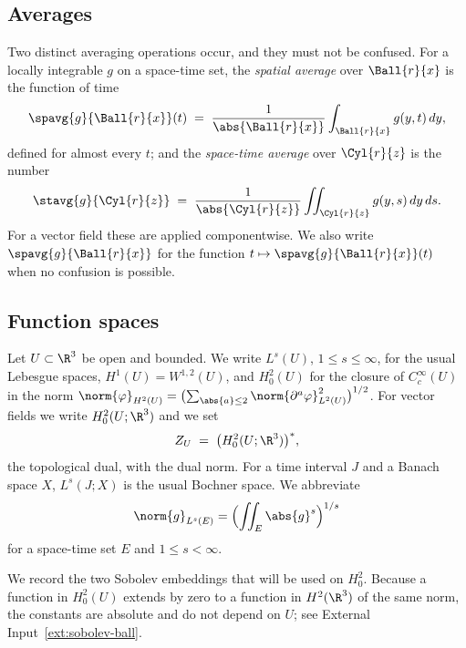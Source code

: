 \documentclass[11pt,reqno]{amsart}
\begin{document}
\subsection{Averages}\label{ss:averages}

Two distinct averaging operations occur, and they must not be confused. For a
locally integrable $g$ on a space-time set, the \emph{spatial average} over
$\Ball{r}{x}$ is the function of time
\begin{equation}\label{eq:spatial-average}
  \spavg{g}{\Ball{r}{x}}(t)
  \;=\;\frac{1}{\abs{\Ball{r}{x}}}\int_{\Ball{r}{x}}g(y,t)\,dy,
\end{equation}
defined for almost every $t$; and the \emph{space-time average} over
$\Cyl{r}{z}$ is the number
\begin{equation}\label{eq:spacetime-average}
  \stavg{g}{\Cyl{r}{z}}
  \;=\;\frac{1}{\abs{\Cyl{r}{z}}}\iint_{\Cyl{r}{z}}g(y,s)\,dy\,ds .
\end{equation}
For a vector field these are applied componentwise. We also write
$\spavg{g}{\Ball{r}{x}}$ for the function $t\mapsto\spavg{g}{\Ball{r}{x}}(t)$
when no confusion is possible.

\subsection{Function spaces}\label{ss:spaces}

Let $U\subset\R^{3}$ be open and bounded. We write $L^{s}(U)$, $1\le s\le\infty$,
for the usual Lebesgue spaces, $H^{1}(U)=W^{1,2}(U)$, and $H^{2}_{0}(U)$ for the
closure of $C_{c}^{\infty}(U)$ in the norm
$\norm{\varphi}_{H^{2}(U)}=\bigl(\sum_{\abs{a}\le2}\norm{\partial^{a}\varphi}_{L^{2}(U)}^{2}\bigr)^{1/2}$.
For vector fields we write $H^{2}_{0}(U;\R^{3})$ and we set
\begin{equation}\label{eq:Z-space}
  Z_{U}\;=\;\bigl(H^{2}_{0}(U;\R^{3})\bigr)^{*},
\end{equation}
the topological dual, with the dual norm. For a time interval $J$ and a Banach
space $X$, $L^{s}(J;X)$ is the usual Bochner space. We abbreviate
\[
  \norm{g}_{L^{s}(E)}=\Bigl(\iint_{E}\abs{g}^{s}\Bigr)^{1/s}
\]
for a space-time set $E$ and $1\le s<\infty$.

We record the two Sobolev embeddings that will be used on $H^{2}_{0}$. Because a
function in $H^{2}_{0}(U)$ extends by zero to a function in $H^{2}(\R^{3})$ of
the same norm, the constants are absolute and do not depend on $U$; see
External Input~\ref{ext:sobolev-ball}.
\end{document}
